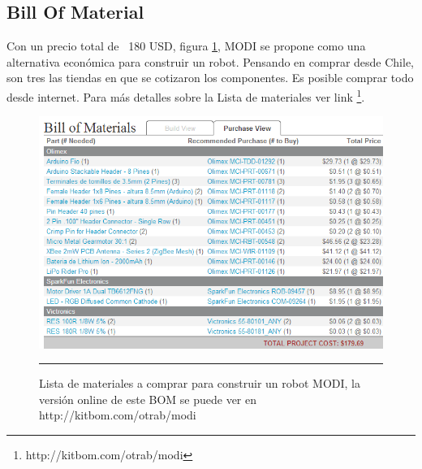 
\subsection{Bill Of Material}

Con un precio total de ~180 USD, figura \ref{fig:BOM}, MODI se propone como una alternativa económica para construir un robot. Pensando en comprar desde Chile, son tres las tiendas en que se cotizaron los componentes. Es posible comprar todo desde internet. Para más detalles sobre la Lista de materiales ver link \footnote{http://kitbom.com/otrab/modi}.
\begin{figure}[htbp]
	\centering
		\includegraphics[width=\textwidth]{./Figures/MODI/kitbom.png}
		\rule{35em}{0.5pt}
	\caption[Bill Of Materials]{Lista de materiales a comprar para construir un robot MODI, la versión online de este BOM se puede ver en http://kitbom.com/otrab/modi}
	\label{fig:BOM}
\end{figure}
